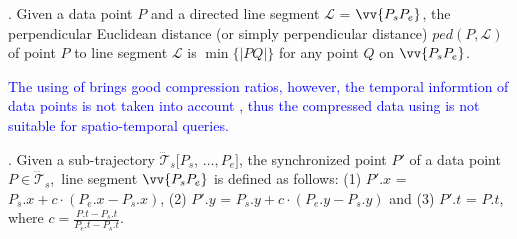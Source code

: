 


. Given a data point $P$ and a directed line segment $\mathcal{L}$ = $\vv{P_{s}P_{e}}$, the perpendicular Euclidean distance (or simply perpendicular distance) $ped(P, \mathcal{L})$ of point $P$ to line segment $\mathcal{L}$ is $\min\{|PQ|\}$ for any point $Q$ on $\vv{P_{s}P_{e}}$.

\textcolor{blue}{The using of \ped brings good compression ratios, however, the temporal informtion of data points is not taken into account \cite{Meratnia:Spatiotemporal}, thus the compressed data using \ped is not suitable for spatio-temporal queries.}


. Given a sub-trajectory $\dddot{\mathcal{T}}_s[P_s$, $\ldots, P_e]$, the synchronized point $P'$ of a data point  $P \in \dddot{\mathcal{T}}_s$,~\wrt line segment $\vv{P_sP_e}$ is defined as follows:
(1) $P'.x$ = $P_s.x +  c\cdot(P_e.x - P_s.x)$,
(2) $P'.y$ = $P_s.y +  c\cdot(P_e.y - P_s.y)$ and
(3) $P'.t$ = $P.t$, where $c= \frac{P.t-P_s.t}{P_e.t-P_s.t}$.


